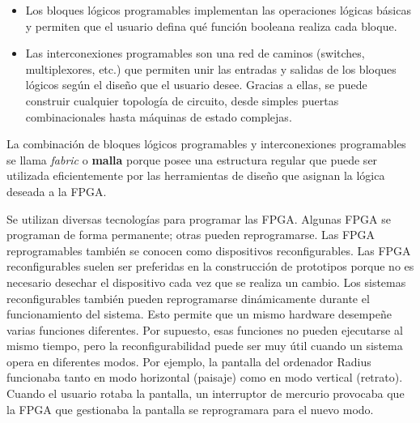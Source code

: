 \begin{itemize}
    \item Los bloques lógicos programables implementan las operaciones lógicas básicas y permiten que el usuario defina qué función booleana realiza cada bloque.

    \item Las interconexiones programables son una red de caminos (switches, multiplexores, etc.) que permiten unir las entradas y salidas de los bloques lógicos según el diseño que el usuario desee. Gracias a ellas, se puede construir cualquier topología de circuito, desde simples puertas combinacionales hasta máquinas de estado complejas.
\end{itemize}
La combinación de bloques lógicos programables y interconexiones programables se llama \textit{fabric} o \textbf{malla} porque posee una estructura regular que puede ser utilizada eficientemente por las herramientas de diseño que asignan la lógica deseada a la FPGA.

Se utilizan diversas tecnologías para programar las FPGA. Algunas FPGA se programan de forma permanente; otras pueden reprogramarse. Las FPGA reprogramables también se conocen como dispositivos reconfigurables. Las FPGA reconfigurables suelen ser preferidas en la construcción de prototipos porque no es necesario desechar el dispositivo cada vez que se realiza un cambio. Los sistemas reconfigurables también pueden reprogramarse dinámicamente durante el funcionamiento del sistema. Esto permite que un mismo hardware desempeñe varias funciones diferentes. Por supuesto, esas funciones no pueden ejecutarse al mismo tiempo, pero la reconfigurabilidad puede ser muy útil cuando un sistema opera en diferentes modos. Por ejemplo, la pantalla del ordenador Radius funcionaba tanto en modo horizontal (paisaje) como en modo vertical (retrato). Cuando el usuario rotaba la pantalla, un interruptor de mercurio provocaba que la FPGA que gestionaba la pantalla se reprogramara para el nuevo modo.




